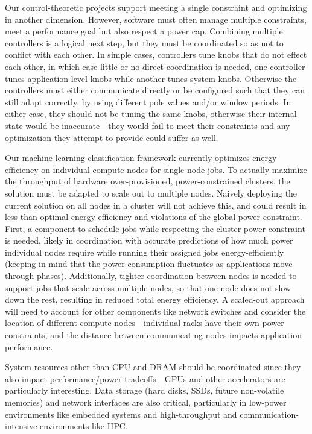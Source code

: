 Our control-theoretic projects support meeting a single constraint and optimizing in another dimension.
However, software must often manage multiple constraints, \eg meet a performance goal but also respect a power cap.
Combining multiple controllers is a logical next step, but they must be coordinated so as not to conflict with each other.
In simple cases, controllers tune knobs that do not effect each other, in which case little or no direct coordination is needed, \eg one controller tunes application-level knobs while another tunes system knobs.
Otherwise the controllers must either communicate directly or be configured such that they can still adapt correctly, \eg by using different pole values and/or window periods.
In either case, they should not be tuning the same knobs, otherwise their internal state would be inaccurate---they would fail to meet their constraints and any optimization they attempt to provide could suffer as well.

Our machine learning classification framework currently optimizes energy efficiency on individual compute nodes for single-node jobs.
To actually maximize the throughput of hardware over-provisioned, power-constrained clusters, the solution must be adapted to scale out to multiple nodes.
Naively deploying the current solution on all nodes in a cluster will not achieve this, and could result in less-than-optimal energy efficiency and violations of the global power constraint.
First, a component to schedule jobs while respecting the cluster power constraint is needed, likely in coordination with accurate predictions of how much power individual nodes require while running their assigned jobs energy-efficiently (keeping in mind that the power consumption fluctuates as applications move through phases).
Additionally, tighter coordination between nodes is needed to support jobs that scale across multiple nodes, so that one node does not slow down the rest, resulting in reduced total energy efficiency.
A scaled-out approach will need to account for other components like network switches and consider the location of different compute nodes---individual racks have their own power constraints, and the distance between communicating nodes impacts application performance.

System resources other than CPU and DRAM should be coordinated since they also impact performance/power tradeoffs---GPUs and other accelerators are particularly interesting.
Data storage (\eg hard disks, SSDs, future non-volatile memories) and network interfaces are also critical, particularly in low-power environments like embedded systems and high-throughput and communication-intensive environments like HPC.

